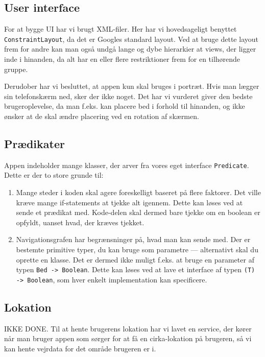 \subsection{User interface}
For at bygge UI har vi brugt XML-filer. Her har vi hovedsageligt benyttet \texttt{ConstraintLayout}, da det er Googles standard layout. Ved at bruge dette layout frem for andre kan man også undgå lange og dybe hierarkier at views, der ligger inde i hinanden, da alt har en eller flere restriktioner frem for en tilhørende gruppe.

Derudober har vi besluttet, at appen kun skal bruges i portræt. Hvis man lægger sin telefonskærm ned, sker der ikke noget. Det har vi vurderet giver den bedste brugeroplevelse, da man f.eks. kan placere bed i forhold til hinanden, og ikke ønsker at de skal ændre placering ved en rotation af skærmen. 

\subsection{Prædikater}
Appen indeholder mange klasser, der arver fra vores eget interface \texttt{Predicate}. Dette er der to store grunde til:

\begin{enumerate}
    \item Mange steder i koden skal agere foreskelligt baseret på flere faktorer. Det ville kræve mange if-statements at tjekke alt igennem. Dette kan løses ved at sende et prædikat med. Kode-delen skal dermed bare tjekke om en boolean er opfyldt, uanset hvad, der kræves tjekket.
    \item Navigationsgrafen har begrænsninger på, hvad man kan sende med. Der er bestemte primitive typer, du kan bruge som parametre --- alternativt skal du oprette en klasse. Det er dermed ikke muligt f.eks. at bruge en parameter af typen \texttt{Bed -> Boolean}. Dette kan løses ved at lave et interface af typen \texttt{(T) -> Boolean}, som hver enkelt implementation kan specificere.
    
\end{enumerate}

\subsection{Lokation}

IKKE DONE. Til at hente brugerens lokation har vi lavet en service, der kører når man bruger appen som sørger for at få en cirka-lokation på brugeren, så vi kan hente vejrdata for det område brugeren er i.

